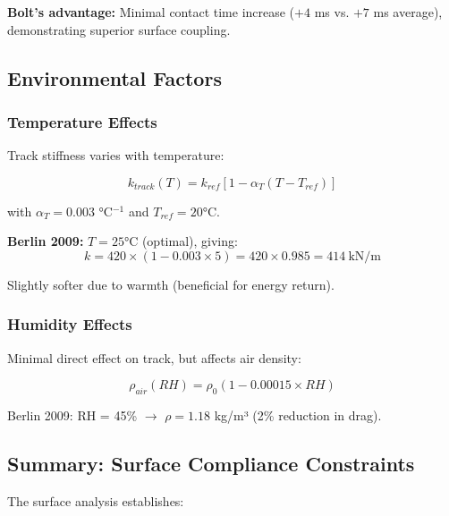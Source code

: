 \textbf{Bolt's advantage:} Minimal contact time increase ($+4$ ms vs. $+7$ ms average), demonstrating superior surface coupling.

\subsection{Environmental Factors}

\subsubsection{Temperature Effects}

Track stiffness varies with temperature:

\begin{equation}
k_{track}(T) = k_{ref} \left[1 - \alpha_T (T - T_{ref})\right]
\label{eq:temperature_stiffness}
\end{equation}

with $\alpha_T = 0.003$ °C$^{-1}$ and $T_{ref} = 20°$C.

\textbf{Berlin 2009:} $T = 25°$C (optimal), giving:
\begin{equation}
k = 420 \times (1 - 0.003 \times 5) = 420 \times 0.985 = 414~\text{kN/m}
\label{eq:berlin_temperature_effect}
\end{equation}

Slightly softer due to warmth (beneficial for energy return).

\subsubsection{Humidity Effects}

Minimal direct effect on track, but affects air density:

\begin{equation}
\rho_{air}(RH) = \rho_0 (1 - 0.00015 \times RH)
\label{eq:humidity_density}
\end{equation}

Berlin 2009: RH = 45\% $\to$ $\rho = 1.18$ kg/m³ (2\% reduction in drag).

\subsection{Summary: Surface Compliance Constraints}

The surface analysis establishes:

